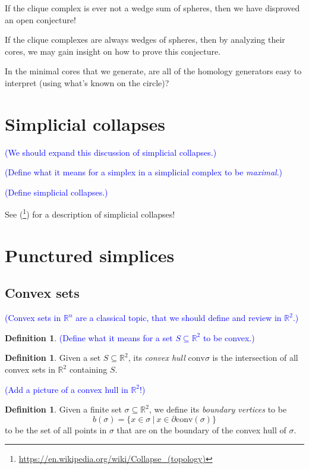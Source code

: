 \documentclass[amscd, amssymb, verbatim]{amsart}[12pt]
\newcommand{\note}[1]{\textcolor{blue}{({#1})}}
\theoremstyle{plain}
\theoremstyle{definition}
\newtheorem{definition}[lemma]{Definition}
\newcommand{\R}{\mathbb{R}}
\newcommand{\conv}{\mathrm{conv}}
\begin{document}
If the clique complex is ever not a wedge sum of spheres, then we have disproved an open conjecture!

If the clique complexes are always wedges of spheres, then by analyzing their cores, we may gain insight on how to prove this conjecture.

In the minimal cores that we generate, are all of the homology generators easy to interpret (using what's known on the circle)?


\section{Simplicial collapses}
\label{sec:collapse}

\note{We should expand this discussion of simplicial collapses.}

\note{Define what it means for a simplex in a simplicial complex to be \emph{maximal}.}

\note{Define simplicial collapses.}

See (\footnote{\url{https://en.wikipedia.org/wiki/Collapse\_(topology)}}) for a description of simplicial collapses!



\section{Punctured simplices}
\label{sec:punctured}

\subsection{Convex sets}

\note{Convex sets in $\R^n$ are a classical topic, that we should define and review in $\R^2$.}

\begin{definition}
\note{Define what it means for a set $S\subseteq\R^2$ to be convex.}
\end{definition}

\begin{definition}
Given a set $S\subseteq \R^2$, its \emph{convex hull} $\conv{\sigma}$ is the intersection of all convex sets in $\R^2$ containing $S$.
\end{definition}

\note{Add a picture of a convex hull in $\R^2$!}

\begin{definition}
Given a finite set $\sigma\subseteq \R^2$, we define its \emph{boundary vertices} to be
\[b(\sigma)=\{x\in \sigma~|~x\in\partial\conv(\sigma)\}\]
to be the set of all points in $\sigma$ that are on the boundary of the convex hull of $\sigma$.
\end{definition}
\end{document}
